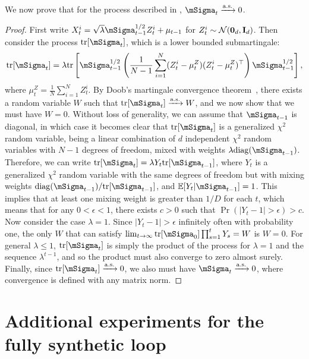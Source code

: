 \documentclass{article}
\def\colorSynthetic{colorA}
\def\synthetic{\textcolor{\colorSynthetic}{fully synthetic loop}}
\begin{document}
We now prove that for the process described in , $\mSigma_t \xrightarrow{\mathrm{a.s.}} 0$.
\begin{proof}
First write $X_t^i = \sqrt{\lambda} \mSigma_{t-1}^{1/2} Z_t^i + \mu_{t-1}$ for $Z_t^i \sim \mathcal{N}(\bm{0}_d, \mathbf I_d)$. 
Then consider the process $\mathrm{tr}[\mSigma_t]$, which is a lower bounded submartingale:
\begin{align}
    \mathrm{tr}[\mSigma_t] = \lambda \mathrm{tr} \left[ \mSigma_{t-1}^{1/2} \left( \frac{1}{N - 1} \sum_{i=1}^N (Z_t^i - \mu^Z_t) 
    (Z_t^i - \mu^Z_t)^\top \right) \mSigma_{t-1}^{1/2} \right],
\end{align}
where $\mu^Z_t = \frac{1}{N} \sum_{i=1}^N Z_t^i$. 
By Doob's martingale convergence theorem~\citep[Ch. 11]{williams1991probability}, there exists a random variable $W$ such that $\mathrm{tr}[\mSigma_t]\xrightarrow{\mathrm{a.s.}} W$, and we now show that we must have $W = 0$.
Without loss of generality, we can assume that $\mSigma_{t-1}$ is diagonal, in which case it becomes clear that $\mathrm{tr}[\mSigma_t]$ is a generalized $\chi^2$ random variable, being a linear combination of $d$ independent $\chi^2$ random variables with $N - 1$ degrees of freedom, mixed with weights $\lambda \mathrm{diag}(\mSigma_{t-1})$.
Therefore, we can write $\mathrm{tr}[\mSigma_t] = \lambda Y_t \mathrm{tr}[\mSigma_{t-1}]$, where $Y_t$ is a generalized $\chi^2$ random variable with the same degrees of freedom but with mixing weights $\mathrm{diag}(\mSigma_{t-1}) / \mathrm{tr}[\mSigma_{t-1}]$, and $\mathbb{E}[Y_t | \mSigma_{t-1}] = 1$. This implies that at least one mixing weight is greater than $1/D$ for each $t$, which means that for any $0 < \epsilon < 1$, there exists $c > 0$ such that $\Pr(|Y_t - 1| > \epsilon) > c$. 
Now consider the case $\lambda = 1$.
Since $|Y_t - 1| > \epsilon$ infinitely often with probability one, the only $W$ that can satisfy $\lim_{t \to \infty} \mathrm{tr}[\mSigma_0] \prod_{s=1}^t Y_s = W$ is $W = 0$. For general $\lambda \leq 1$, $\mathrm{tr}[\mSigma_t]$ is simply the product of the process for $\lambda = 1$ and the sequence $\lambda^{t - 1}$, and so the product must also converge to zero almost surely.
Finally, since $\mathrm{tr}[\mSigma_t] \xrightarrow{\mathrm{a.s.}} 0$, we also must have $\mSigma_t \xrightarrow{\mathrm{a.s.}} 0$, where convergence is defined with any matrix norm.
\end{proof}






\section{Additional experiments for the \synthetic{}}
\label{syntheticappendix}
\end{document}
